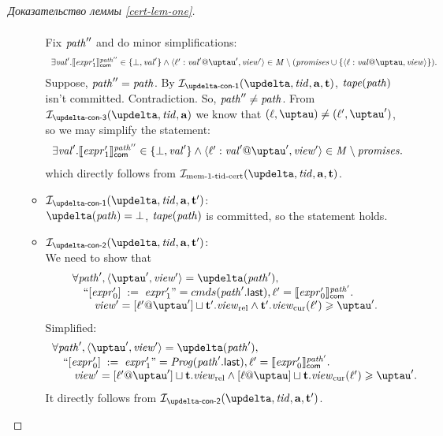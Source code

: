 \begin{proof}[Доказательство леммы \ref{cert-lem-one}]
\begin{itemize}
\begin{itemize}
\[\begin{array}{l}
          \end{array}\]
          Fix $\mathit{path}''$ and do minor simplifications:
          \[\begin{array}{l}
      \exists \stval'. \semfcom{\expr'_1}{\cpath''} \in \{\bot, \stval'\} \land
      \writeEvt{\loc'}{\stval'}{\tau'}{\R'} \in \Mprom \setminus (\PromSet \cup \{\writeEvt{\loc}{\stval}{\tau}{\R}\}). \\
          \end{array}\]
      Suppose, $\mathit{path}'' = \mathit{path}$. By $\invDeltaDefOne(\delta, \tId, \aT, \tT)$, $\mathit{tape}(\mathit{path})$ isn't committed. Contradiction.
      So, $\mathit{path}'' \not = \mathit{path}$.
      From $\invDeltaDefThree(\delta, \tId, \aT)$ we know that $(\loc, \tau) \not = (\loc', \tau')$, so we may simplify the
      statement:
          \[\begin{array}{l}
      \exists \stval'. \semfcom{\expr'_1}{\cpath''} \in \{\bot, \stval'\} \land
      \writeEvt{\loc'}{\stval'}{\tau'}{\R'} \in \Mprom \setminus \PromSet. \\
          \end{array}\]
      which directly follows from $\invMemZeroCERT(\delta, \tId, \aT, \tT)$.

        \item $\invDeltaDefOne(\delta, \tId, \aT, \tT')$: \\
          $\delta(\cpath) = \bot$, $\mathit{tape}(\mathit{path})$ is committed, so the statement holds.
        \item $\invDeltaDefTwo(\delta, \tId, \aT, \tT')$: \\
          We need to show that
          \[\begin{array}{l}
\forall \cpath', \angled{\tau', \R'} = \delta(\cpath'), \\
\quad ``\writeInst{\expr'_0}{\expr'_1}" = \Cprom(\lastInstr{\cpath'}), \loc' = \semfcom{\expr'_0}{\cpath'}. \\
\quad \quad \R' = [\loc' @ \tau'] \sqcup \tT'.\Rrel \land \tT'.\Rcur(\loc') \ge \tau'. \\
          \end{array}\]
          Simplified:
          \[\begin{array}{l}
\forall \cpath', \angled{\tau', \R'} = \delta(\cpath'), \\
\quad ``\writeInst{\expr'_0}{\expr'_1}" = \Cfarm(\lastInstr{\cpath'}), \loc' = \semfcom{\expr'_0}{\cpath'}. \\
\quad \quad \R' = [\loc' @ \tau'] \sqcup \tT.\Rrel \land [\loc @ \tau] \sqcup \tT.\Rcur(\loc') \ge \tau'. \\
          \end{array}\]
          It directly follows from $\invDeltaDefTwo(\delta, \tId, \aT, \tT')$.
          

\end{itemize}
\end{itemize}
\end{proof}
